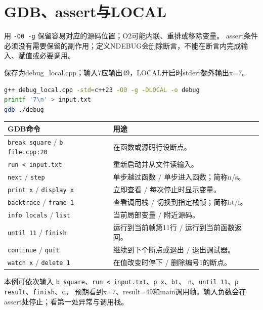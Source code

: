 \section{GDB、assert与LOCAL}
用 \texttt{-O0 -g} 保留容易对应的源码位置；O2可能内联、重排或移除变量。
assert条件必须没有需要保留的副作用；定义NDEBUG会删除断言，不能在断言内完成输入、赋值或必要调用。

保存为debug\_local.cpp；输入7应输出49，LOCAL开启时stderr额外输出x=7。
\begin{lstlisting}[language=bash]
g++ debug_local.cpp -std=c++23 -O0 -g -DLOCAL -o debug
printf '7\n' > input.txt
gdb ./debug
\end{lstlisting}
\begin{longtable}{p{55mm}p{104mm}}\toprule GDB命令 & 用途\\\midrule\endhead
\texttt{break square} / \texttt{b file.cpp:20} & 在函数或源码行设断点。\\
\texttt{run < input.txt} & 重新启动并从文件读输入。\\
\texttt{next} / \texttt{step} & 单步越过函数 / 单步进入函数；简称n/s。\\
\texttt{print x} / \texttt{display x} & 立即查看 / 每次停止时显示变量。\\
\texttt{backtrace} / \texttt{frame 1} & 查看调用栈 / 切换到指定栈帧；简称bt/f。\\
\texttt{info locals} / \texttt{list} & 当前局部变量 / 附近源码。\\
\texttt{until 11} / \texttt{finish} & 运行到当前帧第11行 / 运行到当前函数返回。\\
\texttt{continue} / \texttt{quit} & 继续到下个断点或退出 / 退出调试器。\\
\texttt{watch x} / \texttt{delete 1} & 在值改变时停下 / 删除编号1的断点。\\\bottomrule
\end{longtable}
本例可依次输入 \texttt{b square}、\texttt{run < input.txt}、\texttt{p x}、\texttt{bt}、
\texttt{n}、\texttt{until 11}、\texttt{p result}、\texttt{finish}、\texttt{c}。
预期看到x=7、result=49和main调用帧。输入负数会在assert处停止；看第一处异常与调用栈。

\newpage
